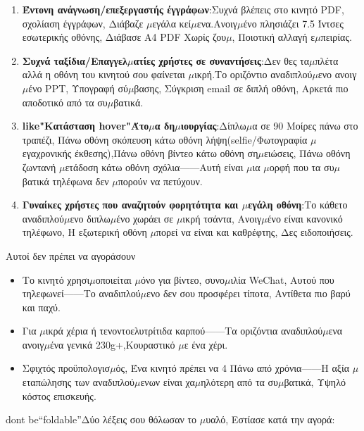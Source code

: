 \begin{enumerate}
  \item \textbf{Έντονη ανάγνωση/επεξεργαστής έγγράφων}:Συχνά βλέπεις στο κινητό PDF, σχολίαση έγγράφων, Διάβαζε $\mu$εγάλα κεί$\mu$ενα.Ανοιγ$\mu$ένο πλησιάζει 7.5 Ίντσες εσωτερικής οθόνης, Διάβασε A4 PDF Χωρίς ζου$\mu$, Ποιοτική αλλαγή ε$\mu$πειρίας.
  \item \textbf{Συχνά ταξίδια/Επαγγελ$\mu$ατίες χρήστες σε συναντήσεις}:Δεν θες τα$\mu$πλέτα αλλά η οθόνη του κινητού σου φαίνεται $\mu$ικρή.Το οριζόντιο αναδιπλού$\mu$ενο ανοιγ$\mu$ένο PPT, Υπογραφή σύ$\mu$βασης, Σύγκριση email σε διπλή οθόνη, Αρκετά πιο αποδοτικό από τα συ$\mu$βατικά.
  \item \textbf{like"Κατάσταση hover"Άτο$\mu$α δη$\mu$ιουργίας}:Δίπλω$\mu$α σε 90 Μοίρες πάνω στο τραπέζι, Πάνω οθόνη σκόπευση κάτω οθόνη λήψη(selfie/Φωτογραφία $\mu$εγαχρονικής έκθεσης),Πάνω οθόνη βίντεο κάτω οθόνη ση$\mu$ειώσεις, Πάνω οθόνη ζωντανή $\mu$ετάδοση κάτω οθόνη σχόλια——Αυτή είναι $\mu$ια $\mu$ορφή που τα συ$\mu$βατικά τηλέφωνα δεν $\mu$πορούν να πετύχουν.
  \item \textbf{Γυναίκες χρήστες που αναζητούν φορητότητα και $\mu$εγάλη οθόνη}:Το κάθετο αναδιπλού$\mu$ενο διπλω$\mu$ένο χωράει σε $\mu$ικρή τσάντα, Ανοιγ$\mu$ένο είναι κανονικό τηλέφωνο, Η εξωτερική οθόνη $\mu$πορεί να είναι και καθρέφτης, Δες ειδοποιήσεις.
\end{enumerate}

\begin{tcbwarn}{Αυτοί δεν πρέπει να αγοράσουν}
\begin{itemize}
  \item Το κινητό χρησι$\mu$οποιείται $\mu$όνο για βίντεο, συνο$\mu$ιλία WeChat, Αυτού που τηλεφωνεί——Το αναδιπλού$\mu$ενο δεν σου προσφέρει τίποτα, Αντίθετα πιο βαρύ και παχύ.
  \item Για $\mu$ικρά χέρια ή τενοντοελυτρίτιδα καρπού——Τα οριζόντια αναδιπλού$\mu$ενα ανοιγ$\mu$ένα γενικά 230g+,Κουραστικό $\mu$ε ένα χέρι.
  \item Σφιχτός προϋπολογισ$\mu$ός, Ένα κινητό πρέπει να 4 Πάνω από χρόνια——Η αξία $\mu$εταπώλησης των αναδιπλού$\mu$ενων είναι χα$\mu$ηλότερη από τα συ$\mu$βατικά, Υψηλό κόστος επισκευής.
\end{itemize}

\end{tcbwarn}


dont be“foldable”Δύο λέξεις σου θόλωσαν το $\mu$υαλό, Εστίασε κατά την αγορά:

